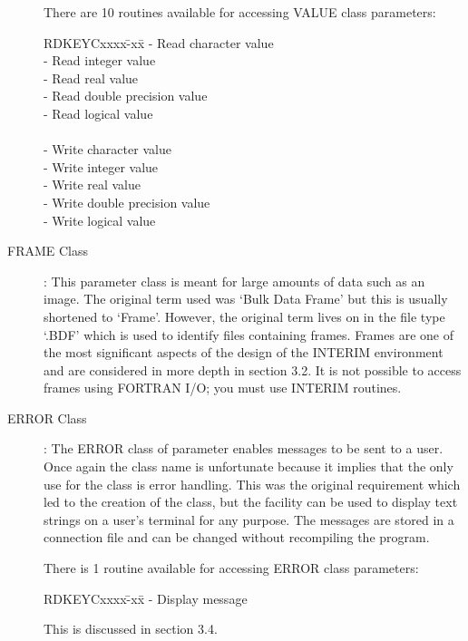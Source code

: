 \begin{description}
There are 10 routines available for accessing VALUE class parameters:
\begin{tabbing}
\hspace{31mm}RDKEYCxxxx\=-xx\=\kill
\hspace{31mm}{\bf RDKEYC} \>- \>Read character value\\
\hspace{31mm}{\bf RDKEYI} \>- \>Read integer value\\
\hspace{31mm}{\bf RDKEYR} \>- \>Read real value\\
\hspace{31mm}{\bf RDKEYD} \>- \>Read double precision value\\
\hspace{31mm}{\bf RDKEYL} \>- \>Read logical value\\
\\
\hspace{31mm}{\bf WRKEYC} \>- \>Write character value\\
\hspace{31mm}{\bf WRKEYI} \>- \>Write integer value\\
\hspace{31mm}{\bf WRKEYR} \>- \>Write real value\\
\hspace{31mm}{\bf WRKEYD} \>- \>Write double precision value\\
\hspace{31mm}{\bf WRKEYL} \>- \>Write logical value
\end{tabbing}
\item [FRAME Class]:
This parameter class is meant for large amounts of data such as an image.
The original term used was `Bulk Data Frame' but this is usually shortened to
`Frame'.
However, the original term lives on in the file type `.BDF' which is used to
identify files containing frames.
Frames are one of the most significant aspects of the design of the INTERIM
environment and are considered in more depth in section 3.2.
It is not possible to access frames using FORTRAN I/O; you must use INTERIM
routines.
\item [ERROR Class]:
The ERROR class of parameter enables messages to be sent to a user.
Once again the class name is unfortunate because it implies that the only
use for the class is error handling.
This was the original requirement which led to the creation of the class,
but the facility can be used to display text strings on a user's terminal
for any purpose.
The messages are stored in a connection file and can be changed without
recompiling the program.

There is 1 routine available for accessing ERROR class parameters:
\begin{tabbing}
\hspace{31mm}RDKEYCxxxx\=-xx\=\kill
\hspace{31mm}{\bf WRERR} \>- \>Display message
\end{tabbing}
This is discussed in section 3.4.
\end{description}
